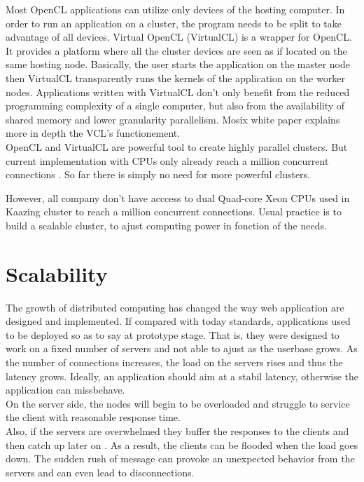 Most OpenCL applications can utilize only devices of the hosting computer. In
order to run an application on a cluster, the program needs to be split to take
advantage of all devices. Virtual OpenCL (VirtualCL) is a wrapper for OpenCL.
It provides a platform where all the cluster devices are seen as if located on
the same hosting node. Basically, the user starts the application on the master
node then VirtualCL transparently runs the kernels of the application on the
worker nodes. Applications written with VirtualCL don't only benefit from the
reduced programming complexity of a single computer, but also from the
availability of shared memory and lower granularity parallelism. Mosix white
paper \citep{Reference7} explains more in depth the VCL's functionement.
\\

OpenCL and VirtualCL are powerful tool to create highly parallel clusters.  But
current implementation with CPUs only already reach a million concurrent
connections \citep{Reference13}. So far there is simply no need for more
powerful clusters.

However, all company don't have acccess to dual Quad-core Xeon CPUs used in
Kaazing cluster to reach a million concurrent connections. Usual practice is to
build a scalable cluster, to ajust computing power in fonction of the needs.

\section{Scalability}

The growth of distributed computing has changed the way web application are
designed and implemented. If compared with today standards, applications used
to be deployed so as to say at prototype stage. That is, they were designed to
work on a fixed number of servers and not able to ajust as the userbase grows.
As the number of connections increases, the load on the servers rises and thus
the latency grows. Ideally, an application should aim at a stabil latency,
otherwise the application can missbehave.\\ 

On the server side, the nodes will begin to be overloaded and struggle to
service the client with reasonable response time.\\ 

Also, if the servers are overwhelmed they buffer the responses to the clients
and then catch up later on . As a result, the clients can be flooded when the
load goes down. The sudden rush of message can provoke an unexpected behavior
from the servers and can even lead to disconnections.\\

